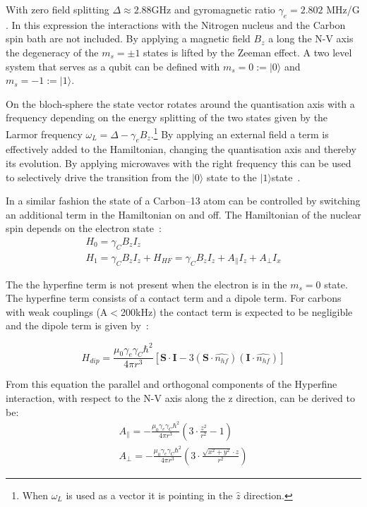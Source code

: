With zero field splitting $\Delta \approx 2.88 \mathrm{GHz}$  and gyromagnetic ratio $\gamma_e  = 2.802$ MHz/G . In this expression the interactions with the Nitrogen nucleus and the Carbon spin bath are not included. By applying a magnetic field $B_z$ a long the N-V axis the degeneracy of the  $m_s =\pm1$ states is lifted by the Zeeman effect. A two level system that serves as a qubit can be defined with  $m_s=0:=|0\rangle$ and $m_s = -1 := |1\rangle$.

On the bloch-sphere the state vector rotates around the quantisation axis with a frequency depending on the energy splitting of the two states given by the Larmor frequency  $\omega_L =\Delta - \gamma_e {B_z} $.\footnote{When  $\omega_L$  is used as a vector it is pointing in the $\hat{z}$ direction.} By applying an external field a term is effectively added to the Hamiltonian, changing the quantisation axis and thereby its evolution. By applying microwaves with the right frequency this can be used to selectively drive the transition from the  $|0\rangle$ state to the $|1\rangle$state~\citep{Jelezko2004Observation}.

In a similar fashion the state of a Carbon--13 atom can be controlled by switching an additional term in the Hamiltonian on and off. The Hamiltonian of the nuclear spin depends on the electron state~\citep{Taminiau2014Universal}:
 \begin{eqnarray}
H_0= \gamma_C B_z I_z \\
H_1 = \gamma_C B_z I_z +H_{HF} = \gamma_C B_z I_z+ A_\parallel I_z + A_\perp I_x
\end{eqnarray}

The the hyperfine term is not present when the electron is in the $m_s = 0$ state. The hyperfine term consists of a contact term and a dipole term. For carbons with weak couplings (A$<$200kHz) the contact term is expected to be negligible and the dipole term is given by~\citep{Lange2012Quantum}:

\begin{equation}
H_{dip} = \frac{\mu_0 \gamma_e \gamma_C \hbar^2 }{4 \pi r^3} [ \mathbf{S \cdot I} - 3 (\mathbf S \cdot \hat{n_{hf}})(\mathbf I \cdot \hat{n_{hf}})]
\end{equation}

From this equation the parallel and orthogonal components of the Hyperfine interaction, with respect to the N-V axis along the z direction, can be derived to be:
 \begin{eqnarray}
A_\parallel= - \frac{\mu_0 \gamma_e \gamma_C \hbar^2 }{4 \pi r^3} \left(3\cdot \frac{z^2}{r^2}-1\right)\\
 A_\perp =  -\frac{\mu_0 \gamma_e \gamma_C \hbar^2 }{4 \pi r^3}\left( 3\cdot\frac{\sqrt{x^2+y^2}\cdot z}{r^2}\right)
\end{eqnarray}


